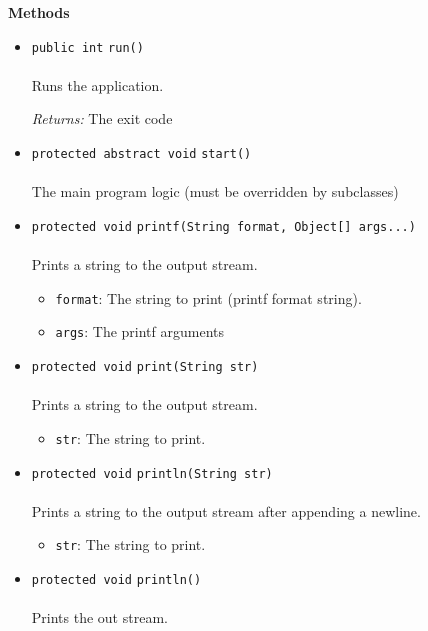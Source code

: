 \textbf{\sffamily Methods}
\begin{itemize}
\item \lstinline|public int| \lstinline|run|\lstinline|()|\\ \\[-0.6em]
Runs the application.

\emph{Returns:} The exit code

\item \lstinline|protected abstract void| \lstinline|start|\lstinline|()|\\ \\[-0.6em]
The main program logic (must be overridden by subclasses)



\item \lstinline|protected void| \lstinline|printf|\lstinline|(String format, Object[] args...)|\\ \\[-0.6em]
Prints a string to the output stream.
\begin{itemize}
\item \lstinline|format|: The string to print (printf format string).
\item \lstinline|args|: The printf arguments
\end{itemize}



\item \lstinline|protected void| \lstinline|print|\lstinline|(String str)|\\ \\[-0.6em]
Prints a string to the output stream.
\begin{itemize}
\item \lstinline|str|: The string to print.
\end{itemize}



\item \lstinline|protected void| \lstinline|println|\lstinline|(String str)|\\ \\[-0.6em]
Prints a string to the output stream after appending a newline.
\begin{itemize}
\item \lstinline|str|: The string to print.
\end{itemize}



\item \lstinline|protected void| \lstinline|println|\lstinline|()|\\ \\[-0.6em]
Prints the out stream.




\end{itemize}
